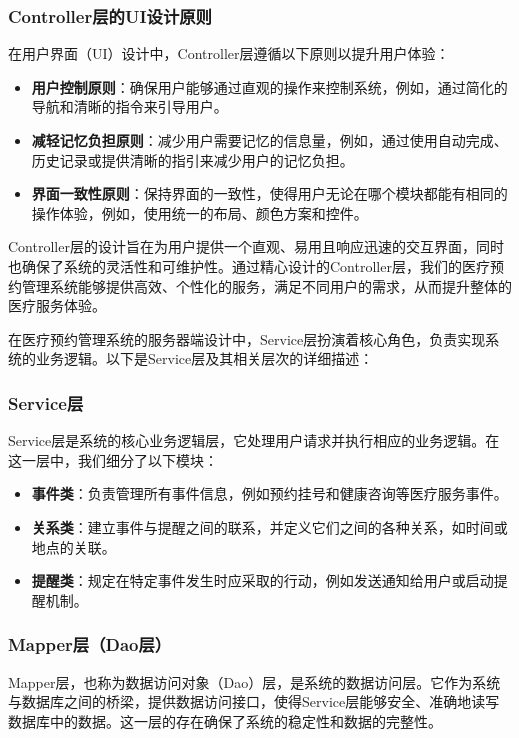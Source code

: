 \subsubsection*{Controller层的UI设计原则}
在用户界面（UI）设计中，Controller层遵循以下原则以提升用户体验：
\begin{itemize}
	\item \textbf{用户控制原则}：确保用户能够通过直观的操作来控制系统，例如，通过简化的导航和清晰的指令来引导用户。
	
	\item \textbf{减轻记忆负担原则}：减少用户需要记忆的信息量，例如，通过使用自动完成、历史记录或提供清晰的指引来减少用户的记忆负担。
	
	\item \textbf{界面一致性原则}：保持界面的一致性，使得用户无论在哪个模块都能有相同的操作体验，例如，使用统一的布局、颜色方案和控件。
\end{itemize}

Controller层的设计旨在为用户提供一个直观、易用且响应迅速的交互界面，同时也确保了系统的灵活性和可维护性。通过精心设计的Controller层，我们的医疗预约管理系统能够提供高效、个性化的服务，满足不同用户的需求，从而提升整体的医疗服务体验。

在医疗预约管理系统的服务器端设计中，Service层扮演着核心角色，负责实现系统的业务逻辑。以下是Service层及其相关层次的详细描述：

\subsubsection*{Service层}
Service层是系统的核心业务逻辑层，它处理用户请求并执行相应的业务逻辑。在这一层中，我们细分了以下模块：

\begin{itemize}
	\item \textbf{事件类}：负责管理所有事件信息，例如预约挂号和健康咨询等医疗服务事件。
	
	\item \textbf{关系类}：建立事件与提醒之间的联系，并定义它们之间的各种关系，如时间或地点的关联。
	
	\item \textbf{提醒类}：规定在特定事件发生时应采取的行动，例如发送通知给用户或启动提醒机制。
\end{itemize}

\subsubsection*{Mapper层（Dao层）}
Mapper层，也称为数据访问对象（Dao）层，是系统的数据访问层。它作为系统与数据库之间的桥梁，提供数据访问接口，使得Service层能够安全、准确地读写数据库中的数据。这一层的存在确保了系统的稳定性和数据的完整性。

